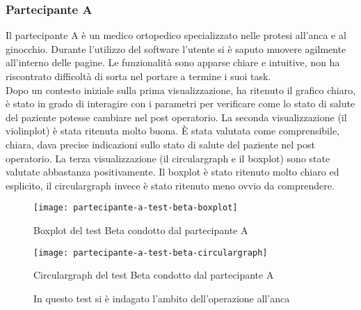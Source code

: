 \subsubsection{Partecipante A}
Il partecipante A è un medico ortopedico specializzato nelle protesi all'anca e al ginocchio.
Durante l'utilizzo del software l'utente si è saputo muovere agilmente all'interno delle pagine. Le funzionalità sono apparse chiare e intuitive, non ha riscontrato difficoltà di sorta nel portare a termine i suoi task. \\
Dopo un contesto iniziale sulla prima visualizzazione, ha ritenuto il grafico chiaro, è stato in grado di interagire con i parametri per verificare come lo stato di salute del paziente potesse cambiare nel post operatorio. La seconda visualizzazione (il violinplot) è stata ritenuta molto buona. È stata valutata come comprensibile, chiara, dava precise indicazioni sullo stato di salute del paziente nel post operatorio. La terza visualizzazione (il circulargraph e il boxplot) sono state valutate abbastanza positivamente. Il boxplot è stato ritenuto molto chiaro ed esplicito, il circulargraph invece è stato ritenuto meno ovvio da comprendere. \\ 

\begin{figure}[htbp]
    \centering
    \begin{minipage}{0.45\textwidth}
        \centering
        \texttt{[image: partecipante-a-test-beta-boxplot]}
        \caption{Boxplot del test Beta condotto dal partecipante A}
        \label{fig:boxplot-partecipante-a}
    \end{minipage}\hfill
    \begin{minipage}{0.45\textwidth}
        \centering
        \texttt{[image: partecipante-a-test-beta-circulargraph]}
        \caption{Circulargraph del test Beta condotto dal partecipante A}
        \label{fig:circulargraph-partecipante-a}
    \end{minipage}
    \caption*{In questo test si è indagato l'ambito dell'operazione all'anca}
\end{figure}

